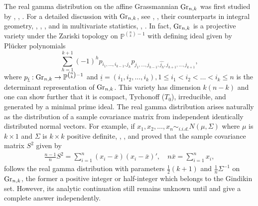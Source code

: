 \documentclass{amsart}
\theoremstyle{definition}
\numberwithin{equation}{section}
\begin{document}
The real gamma distribution on the affine Grassmannian ${\rm Gr}_{n,k}$ was first studied by \cite{wishart1928generalised}, \cite{ingham1933integral}, \cite{herz1955}. For a detailed discussion with ${\rm Gr}_{n,k}$, see \cite{goodman2009gtm255}, \cite{lakshmibai2015grassmannian,lakshmibai2001flag}, their counterparts in integral geometry, \cite{faraut1994analysis}, \cite{helgason2001differential}, \cite{gel2014integral}, and in multivariate statistics, \cite{muirhead1982aspects}, \cite{mathai2022mul}. In fact, ${\rm Gr}_{n,k}$ is a projective variety under the Zariski topology on $\mathbb{P}^{\binom{n}{k}-1}$ with defining ideal given by Pl\"ucker polynomials
\[\sum_{h=1}^{k+1} (-1)^{h} p_{i_1,\dots,i_{k-1},j_h} p_{j_1,\dots,j_{h-1},\widehat{j_h},j_{h+1},\dots,j_{k+1}},\]
where $p_{\underline{i}}:{\rm Gr}_{n,k} \to \mathbb{P}^{{n \choose k}-1}$ and $\underline{i} = (i_1,i_2,\dots,i_k), 1\leq i_1 < i_2 < \dots < i_k \leq n$ is the determinant representation of ${\rm Gr}_{n,k}$. This variety has dimension $k(n-k)$ and one can show further that it is compact, Tychonoff ($T_0$), irreducible, and generated by a minimal prime ideal. The real gamma distribution arises naturally as the distribution of a sample covariance matrix from independent identically distributed normal vectors. For example, if $x_1,x_2,\dots,x_n \sim_{i.i.d.} N(\mu,\Sigma)$ where $\mu$ is $k\times 1$ and $\Sigma$ is $k\times k$ positive definite, \cite{student1908}, \cite{cochran1946relative}, and \cite{dykstra1970establishing} proved that the sample covariance matrix $S^2$ given by
\[\begin{aligned}
    \frac{n-1}{n} S^2 = \sum_{i=1}^n (x_i - \bar{x})(x_i - \bar{x})',
\quad    n\bar{x} = \sum_{i=1}^{n} x_i,
\end{aligned}\]
follows the real gamma distribution with parameters $\frac{1}{2}(k+1)$ and $\frac{1}{n}\Sigma^{-1}$ on ${\rm Gr}_{n,k}$, the former a positive integer or half-integer which belongs to the Gindikin set. However, its analytic continuation still remains unknown until \cite{letac2018laplace} and \cite{mayerhofer2019wishart} give a complete answer independently.
\end{document}
